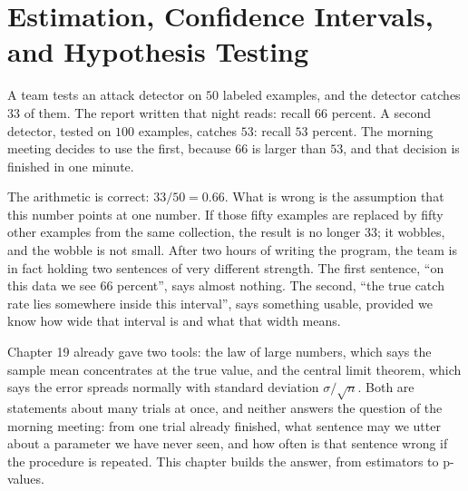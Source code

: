 \chapter{Estimation, Confidence Intervals, and Hypothesis Testing}

A team tests an attack detector on $50$ labeled examples, and the detector catches $33$ of
them. The report written that night reads: recall $66$ percent. A second detector, tested on
$100$ examples, catches $53$: recall $53$ percent. The morning meeting decides to use the
first, because $66$ is larger than $53$, and that decision is finished in one minute.

The arithmetic is correct: $33/50=0.66$. What is wrong is the assumption that this number
points at one number. If those fifty examples are replaced by fifty other examples from the
same collection, the result is no longer $33$; it wobbles, and the wobble is not small. After
two hours of writing the program, the team is in fact holding two sentences of very different
strength. The first sentence, ``on this data we see $66$ percent'', says almost nothing. The
second, ``the true catch rate lies somewhere inside this interval'', says something usable,
provided we know how wide that interval is and what that width means.

Chapter 19 already gave two tools: the law of large numbers, which says the sample mean
concentrates at the true value, and the central limit theorem, which says the error spreads
normally with standard deviation $\sigma/\sqrt n$. Both are statements about many trials at
once, and neither answers the question of the morning meeting: from one trial already
finished, what sentence may we utter about a parameter we have never seen, and how often is
that sentence wrong if the procedure is repeated. This chapter builds the answer, from
estimators to p-values.

